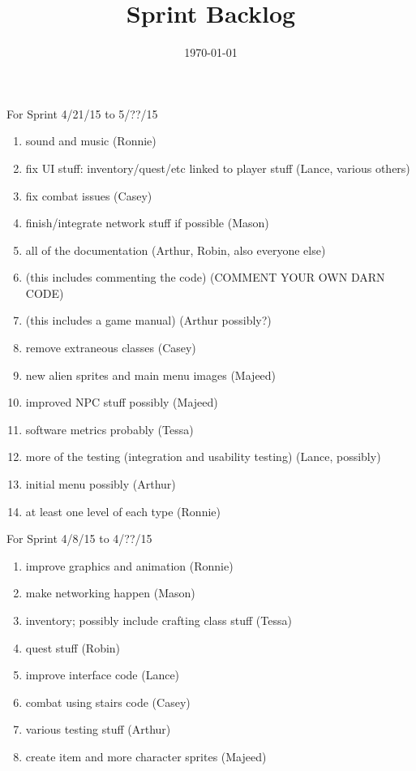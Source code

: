 \documentclass[12pt]{article}
\title{Sprint Backlog}
\date{\today}
\begin{document}
\maketitle



\begin{section}{For Sprint 4/21/15 to 5/??/15}
\begin{enumerate}

\item sound and music (Ronnie)
\item fix UI stuff: inventory/quest/etc linked to player stuff (Lance, various others)
\item fix combat issues (Casey)
\item finish/integrate network stuff if possible (Mason)
\item all of the documentation (Arthur, Robin, also everyone else)
\item (this includes commenting the code) (COMMENT YOUR OWN DARN CODE) 
\item (this includes a game manual) (Arthur possibly?)
\item remove extraneous classes (Casey)
\item new alien sprites and main menu images (Majeed)
\item improved NPC stuff possibly (Majeed)
\item software metrics probably (Tessa)
\item more of the testing (integration and usability testing) (Lance, possibly) 
\item initial menu possibly (Arthur)
\item at least one level of each type (Ronnie) 


\end{enumerate}
\end{section}






\begin{section}{For Sprint 4/8/15 to 4/??/15}
\begin{enumerate}


\item improve graphics and animation (Ronnie)
\item make networking happen (Mason) 
\item inventory; possibly include crafting class stuff (Tessa) 
\item quest stuff (Robin)
\item improve interface code (Lance)
\item combat using stairs code (Casey)
\item various testing stuff (Arthur)
\item create item and more character sprites (Majeed)


\end{enumerate}
\end{section}
\end{document}
